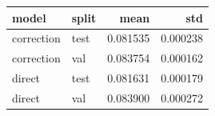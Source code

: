 \begin{tabular}{llrr}
\toprule
model & split & mean & std \\
\midrule
correction & test & 0.081535 & 0.000238 \\
correction & val & 0.083754 & 0.000162 \\
direct & test & 0.081631 & 0.000179 \\
direct & val & 0.083900 & 0.000272 \\
\bottomrule
\end{tabular}
